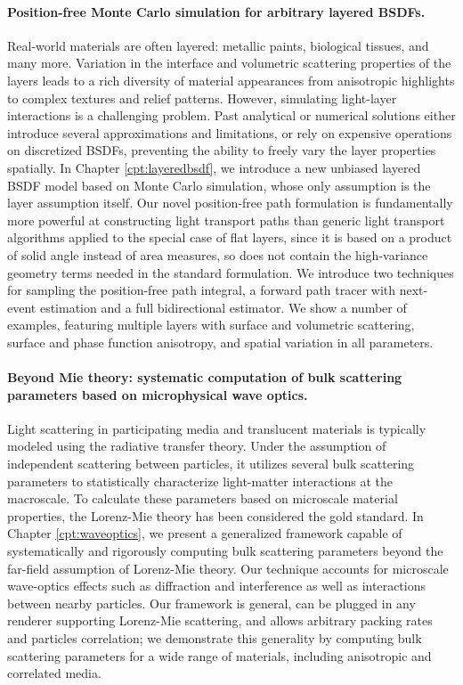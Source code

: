 \paragraph{Position-free Monte Carlo simulation for arbitrary layered BSDFs.}
Real-world materials are often layered: metallic paints, biological tissues, and many more. Variation in the interface and volumetric scattering properties of the layers leads to a rich diversity of material appearances from anisotropic highlights to complex textures and relief patterns. However, simulating light-layer interactions is a challenging problem. Past analytical or numerical solutions either introduce several approximations and limitations, or rely on expensive operations on discretized BSDFs, preventing the ability to freely vary the layer properties spatially. 
In Chapter \ref{cpt:layeredbsdf}, we introduce a new unbiased layered BSDF model based on Monte Carlo simulation, whose only assumption is the layer assumption itself. Our novel position-free path formulation is fundamentally more powerful at constructing light transport paths than generic light transport algorithms applied to the special case of flat layers, since it is based on a product of solid angle instead of area measures, so does not contain the high-variance geometry terms needed in the standard formulation. We introduce two techniques for sampling the position-free path integral, a forward path tracer with next-event estimation and a full bidirectional estimator. We show a number of examples, featuring multiple layers with surface and volumetric scattering, surface and phase function anisotropy, and spatial variation in all parameters.

\paragraph{Beyond Mie theory: systematic computation of bulk scattering parameters based on microphysical wave optics.}
Light scattering in participating media and translucent materials is typically modeled using the radiative transfer theory. Under the assumption of independent scattering between particles, it utilizes several bulk scattering parameters to statistically characterize light-matter interactions at the macroscale. To calculate these parameters based on microscale material properties, the Lorenz-Mie theory has been considered the gold standard.
In Chapter \ref{cpt:waveoptics}, we present a generalized framework capable of systematically and rigorously computing bulk scattering parameters beyond the far-field assumption of Lorenz-Mie theory. Our technique accounts for microscale wave-optics effects such as diffraction and interference as well as interactions between nearby particles. Our framework is general, can be plugged in any renderer supporting Lorenz-Mie scattering, and allows arbitrary packing rates and particles correlation; we demonstrate this generality by computing bulk scattering parameters for a wide range of materials, including anisotropic and correlated media.

